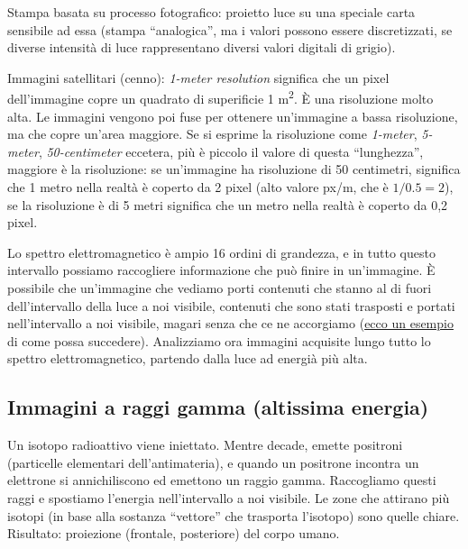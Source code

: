\documentclass[a4paper,11pt]{article}
\begin{document}
\par
Stampa basata su processo fotografico: proietto luce su una speciale carta sensibile ad essa (stampa ``analogica'', ma i valori possono essere discretizzati, se diverse intensità
di luce rappresentano diversi valori digitali di grigio).
\par
Immagini satellitari (cenno): \textit{1-meter resolution} significa che un pixel dell'immagine copre un quadrato di superificie 1 m\textsuperscript{2}. È una
risoluzione molto alta. Le immagini vengono poi fuse per ottenere un'immagine a bassa risoluzione, ma che copre un'area maggiore.
Se si esprime la risoluzione come \textit{1-meter}, \textit{5-meter}, \textit{50-centimeter} eccetera, più è piccolo il valore di questa ``lunghezza'',
maggiore è la risoluzione: se un'immagine ha risoluzione di 50 centimetri, significa che 1 metro nella realtà è coperto da 2 pixel (alto valore px/m, che è $1/0.5 = 2$),
se la risoluzione è di 5 metri significa che un metro nella realtà è coperto da 0,2 pixel.
\par
Lo spettro elettromagnetico è ampio 16 ordini di grandezza, e in tutto questo intervallo possiamo raccogliere informazione
che può finire in un'immagine. È possibile che un'immagine che vediamo porti contenuti che stanno al di fuori dell'intervallo
della luce a noi visibile, contenuti che sono stati trasposti e portati nell'intervallo a noi visibile, magari senza che ce ne accorgiamo (\hyperref[sec:moving_energy]{ecco un esempio} di come possa succedere).
Analizziamo ora immagini acquisite lungo tutto lo spettro elettromagnetico, partendo dalla luce ad energià più alta.

\subsection{Immagini a raggi gamma (altissima energia)}
Un isotopo radioattivo viene iniettato. Mentre decade, emette positroni (particelle elementari dell'antimateria), e quando un positrone incontra
un elettrone si annichiliscono ed emettono un raggio gamma. Raccogliamo questi raggi e spostiamo l'energia nell'intervallo a noi visibile.
Le zone che attirano più isotopi (in base alla sostanza ``vettore'' che trasporta l'isotopo) sono quelle chiare.
Risultato: proiezione (frontale, posteriore) del corpo umano.
\end{document}
